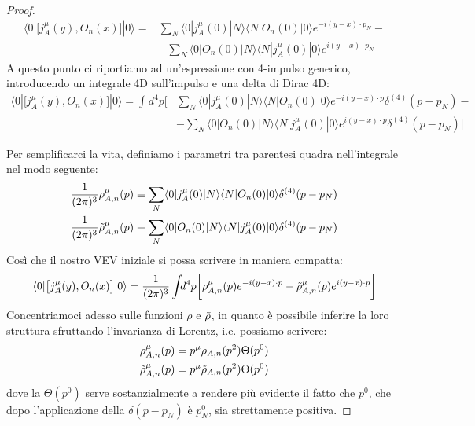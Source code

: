 \documentclass[../main.tex]{subfiles}
\begin{document}
\begin{proof}
    \begin{align*}
        \langle 0|\big[j^\mu_A(y), O_n(x)\big]|0\rangle = &\sum_N\langle 0|j^\mu_A(0) |N\rangle\langle N| O_n(0)|0\rangle e^{-i(y-x)\cdot p_N}-\\
        &-  \sum_N\langle 0| O_n(0) |N\rangle\langle N| j^\mu_A(0) |0\rangle e^{i(y-x)\cdot p_N}
    \end{align*}
    A questo punto ci riportiamo ad un'espressione con 4-impulso generico, introducendo un integrale 4D sull'impulso e una delta di Dirac 4D:
    \begin{align*}
        \langle 0|\big[j^\mu_A(y), O_n(x)\big]|0\rangle =\int_{}d^4p\bigg[&\sum_N\langle 0|j^\mu_A(0) |N\rangle\langle N| O_n(0)|0\rangle e^{-i(y-x)\cdot p}\delta^{(4)}(p-p_N)-\\
        &-  \sum_N\langle 0| O_n(0) |N\rangle\langle N| j^\mu_A(0) |0\rangle e^{i(y-x)\cdot p}\delta^{(4)}(p-p_N)\bigg]
    \end{align*}

    Per semplificarci la vita, definiamo i parametri tra parentesi quadra nell'integrale nel modo seguente:
    \begin{align*}
        &\frac{1}{(2\pi)^3}\rho^\mu_{A,n}(p) \equiv \sum_N\langle 0|j^\mu_A(0) |N\rangle\langle N| O_n(0)|0\rangle \delta^{(4)}(p-p_N)\\
        &\frac{1}{(2\pi)^3}\Tilde{\rho}^\mu_{A,n}(p) \equiv \sum_N\langle 0| O_n(0) |N\rangle\langle N| j^\mu_A(0) |0\rangle \delta^{(4)}(p-p_N)
    \end{align*}
    Così che il nostro VEV iniziale si possa scrivere in maniera compatta:
    \begin{equation}
        \begin{aligned}
            \langle 0|\big[j^\mu_A(y), O_n(x)\big]|0\rangle =\frac{1}{(2\pi)^3}\int_{}d^4p\bigg[\rho^\mu_{A,n}(p)e^{-i(y-x)\cdot p}-  \Tilde{\rho}^\mu_{A,n}(p)e^{i(y-x)\cdot p}\bigg]
        \end{aligned}
        \label{eq:comm_VEV_rhos}
    \end{equation}
    Concentriamoci adesso sulle funzioni $\rho$ e $\Tilde{\rho}$, in quanto è possibile inferire la loro struttura sfruttando l'invarianza di Lorentz, i.e. possiamo scrivere:
    \begin{align*}
        &\rho^\mu_{A,n}(p) = p^\mu \rho_{A,n}(p^2)\Theta(p^0)\\
        &\Tilde{\rho}^\mu_{A,n}(p) = p^\mu \Tilde\rho_{A,n}(p^2)\Theta(p^0)
    \end{align*}
    dove la $\Theta(p^0)$ serve sostanzialmente a rendere più evidente il fatto che $p^0$, che dopo l'applicazione della $\delta(p-p_N)$ è $p^0_N$, sia strettamente positiva.


\end{proof}
\end{document}
